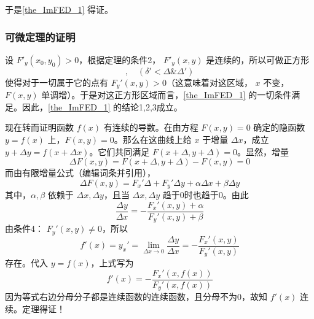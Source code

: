 于是\autoref{the_ImFED_1} 得证。
\subsubsection{可微定理的证明}
设 $F'_y(x_0,y_0)>0$，根据定理的条件2， $F'_y(x,y)$ 是连续的，所以可做正方形
\begin{equation}
[x_0-\delta',x_0+\delta';y_0-\delta',y_0+\delta'],\quad(\delta'<\Delta \&\Delta') 
\end{equation}
使得对于一切属于它的点有 $F_y'(x,y)>0$（这意味着对这区域， $x$ 不变，$F(x,y)$ 单调增）。于是对这正方形区域而言，\autoref{the_ImFED_1} 的一切条件满足。因此，\autoref{the_ImFED_1} 的结论1,2,3成立。

现在转而证明函数 $f(x)$ 有连续的导数。在由方程 $F(x,y)=0$ 确定的隐函数 $y=f(x)$ 上，$F(x,y)=0$。那么在这曲线上给 $x$ 于增量 $\Delta x$，成立 $y+\Delta y=f(x+\Delta x)$。它们共同满足 $F(x+\Delta,y+\Delta)=0$。显然，增量
\begin{equation}
\Delta F(x,y)=F(x+\Delta,y+\Delta)-F(x,y)=0
\end{equation}
而由有限增量公式（编辑词条并引用），
\begin{equation}
\Delta F(x,y)=F_x'\Delta+F_y'\Delta y+\alpha\Delta x+\beta\Delta y
\end{equation}
其中，$\alpha,\beta$ 依赖于 $\Delta x,\Delta y$，且当 $\Delta x,\Delta y$ 趋于0时也趋于0。由此
\begin{equation}
\frac{\Delta y}{\Delta x}=-\frac{F_x'(x,y)+\alpha}{F_y'(x,y)+\beta}
\end{equation}
由条件4： $F_y'(x,y)\neq0$，所以
\begin{equation}
f'(x)=y_x'=\lim_{\Delta x\rightarrow 0}\frac{\Delta y}{\Delta x}=-\frac{F_x'(x,y)}{F_y'(x,y)}
\end{equation}
存在。代入 $y=f(x)$，上式写为
\begin{equation}
f'(x)=-\frac{F_x'(x,f(x))}{F_y'(x,f(x))}
\end{equation}
因为等式右边分母分子都是连续函数的连续函数，且分母不为0，故知 $f'(x)$ 连续。定理得证！

